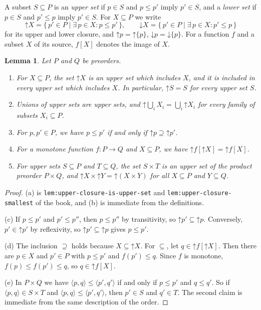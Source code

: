 \documentclass[11pt,a4paper]{article}
\theoremstyle{plain}
\newtheorem{lemma}[theorem]{Lemma}
\theoremstyle{definition}
\theoremstyle{remark}
\newcommand{\tup}[1]{\langle #1 \rangle}
\newcommand{\up}{\mathord{\uparrow}}
\newcommand{\dn}{\mathord{\downarrow}}
\newcommand{\lbl}[1]{\nolinkurl{#1}}
\begin{document}
A subset $S \subseteq P$ is an \emph{upper set} if $p \in S$ and $p \leq p'$ imply $p' \in S$, and a \emph{lower set} if $p \in S$ and $p' \leq p$ imply $p' \in S$.
For $X \subseteq P$ we write
\begin{equation*}
    \up X = \{\, p' \in P \mid \exists\, p \in X \colon p \leq p' \,\},
    \qquad
    \dn X = \{\, p' \in P \mid \exists\, p \in X \colon p' \leq p \,\}
\end{equation*}
for its upper and lower closure, and $\up p = \up \{p\}$, $\dn p = \dn \{p\}$.
For a function $f$ and a subset $X$ of its source, $f[X]$ denotes the image of $X$.

\begin{lemma}
    \label{lem:upper-closure}
    Let $P$ and $Q$ be preorders.
    \begin{enumerate}[label=(\alph*)]
        \item For $X \subseteq P$, the set $\up X$ is an upper set which includes $X$, and it is included in every upper set which includes $X$.
              In particular, $\up S = S$ for every upper set $S$.
        \item Unions of upper sets are upper sets, and $\up \bigcup_{i} X_i = \bigcup_{i} \up X_i$ for every family of subsets $X_i \subseteq P$.
        \item For $p, p' \in P$, we have $p \leq p'$ if and only if $\up p \supseteq \up p'$.
        \item For a monotone function $f \colon P \to Q$ and $X \subseteq P$, we have $\up f[\up X] = \up f[X]$.
        \item For upper sets $S \subseteq P$ and $T \subseteq Q$, the set $S \times T$ is an upper set of the product preorder $P \times Q$, and $\up X \times \up Y = \up (X \times Y)$ for all $X \subseteq P$ and $Y \subseteq Q$.
    \end{enumerate}
\end{lemma}
\begin{proof}
    (a) is \lbl{lem:upper-closure-is-upper-set} and \lbl{lem:upper-closure-smallest} of the book, and (b) is immediate from the definitions.

    (c) If $p \leq p'$ and $p' \leq p''$, then $p \leq p''$ by transitivity, so $\up p' \subseteq \up p$.
    Conversely, $p' \in \up p'$ by reflexivity, so $\up p' \subseteq \up p$ gives $p \leq p'$.

    (d) The inclusion $\supseteq$ holds because $X \subseteq \up X$.
    For $\subseteq$, let $q \in \up f[\up X]$.
    Then there are $p \in X$ and $p' \in P$ with $p \leq p'$ and $f(p') \leq q$.
    Since $f$ is monotone, $f(p) \leq f(p') \leq q$, so $q \in \up f[X]$.

    (e) In $P \times Q$ we have $\tup{p,q} \leq \tup{p',q'}$ if and only if $p \leq p'$ and $q \leq q'$.
    So if $\tup{p,q} \in S \times T$ and $\tup{p,q} \leq \tup{p',q'}$, then $p' \in S$ and $q' \in T$.
    The second claim is immediate from the same description of the order.
\end{proof}
\end{document}
